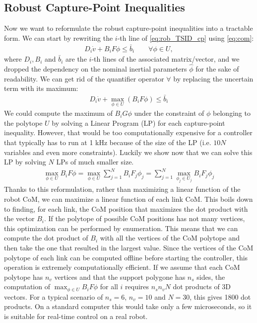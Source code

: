 \subsection{Robust Capture-Point Inequalities}
Now we want to reformulate the robust capture-point inequalities into a tractable form.
We can start by rewriting the $i$-th line of \eqref{eq:rob_TSID_cp} using \eqref{eq:com}:
\begin{align*}
D_i \dot{v} + B_i F \phi \le \bar{b}_i \qquad \forall \phi \in U,
\end{align*}
where $D_i, B_i$ and $\bar{b}_i$ are the $i$-th lines of the associated matrix/vector, and we dropped the dependency on the nominal inertial parameters $\hat{\phi}$ for the sake of readability.
We can get rid of the quantifier operator $\forall$ by replacing the uncertain term with its maximum:
\begin{align}
D_i \dot{v} + \max_{\phi \in U} (B_i F \phi) \le \bar{b}_i
\end{align}
We could compute the maximum of $B_i G \phi$ under the constraint of $\phi$ belonging to the polytope $U$ by solving a Linear Program (LP) for each capture-point inequality.
However, that would be too computationally expensive for a controller that typically has to run at 1 kHz because of the size of the LP (i.e. $10N$ variables and even more constraints).
Luckily we show now that we can solve this LP by solving $N$ LPs of much smaller size.
\begin{align}
\max_{\phi \in U}  B_i F \phi = \max_{\phi \in U}  \sum_{j=1}^N B_i F_j \phi_j = 
\sum_{j=1}^N \max_{\phi_j \in U_j} B_i F_j \phi_j
\end{align}
Thanks to this reformulation, rather than maximizing a linear function of the robot CoM, we can maximize a linear function of each link CoM.
This boils down to finding, for each link, the CoM position that maximizes the dot product with the vector $B_i$.
If the polytope of possible CoM positions has not many vertices, this optimization can be performed by enumeration.
This means that we can compute the dot product of $B_i$ with all the vertices of the CoM polytope and then take the one that resulted in the largest value.
Since the vertices of the CoM polytope of each link can be computed offline before starting the controller, this operation is extremely computationally efficient.
If we assume that each CoM polytope has $n_v$ vertices and that the support polygone has $n_s$ sides, the computation of $\max_{\phi \in U}  B_i F \phi$ for all  $i$ requires $n_s n_v N$ dot products of 3D vectors.
For a typical scenario of $n_s=6$, $n_v=10$ and $N=30$, this gives 1800 dot products.
On a standard computer this would take only a few microseconds, so it is suitable for real-time control on a real robot.

